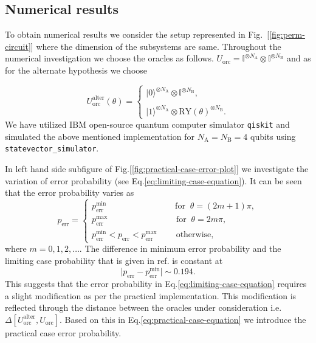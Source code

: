 \documentclass[%
 aps,
 jmp,%
 amsmath,amssymb,
 reprint,%
]{revtex4-2}
\begin{document}
\subsection{Numerical results}
To obtain numerical results we consider the setup represented in Fig.~[\ref{fig:perm-circuit}] where the dimension of the subsystems are same. Throughout the numerical investigation we choose the oracles as follows. $U_\textrm{orc} = \mathbb{I}^{\otimes N_\textrm{A}}\otimes \mathbb{I}^{\otimes N_\textrm{B}}$ and as for the alternate hypothesis we choose

\begin{equation}
U_\textrm{orc}^\textrm{alter}(\theta)= 
\begin{cases}
\lvert0\rangle^{\otimes N_\textrm{A}} \otimes \mathbb{I}^{\otimes N_\textrm{B}}, \\\\
\lvert1\rangle^{\otimes N_\textrm{A}} \otimes \textrm{RY}(\theta)^{\otimes N_\textrm{B}}.
\end{cases}
\label{eq:alternate-hypothesis}
\end{equation}
We have utilized IBM open-source
quantum computer simulator \texttt{qiskit} and simulated the above mentioned implementation for $N_\textrm{A} = N_\textrm{B} = 4$ qubits using \texttt{statevector\_simulator}. 

In left hand side subfigure of Fig.[\ref{fig:practical-case-error-plot}] we investigate the variation of error probability (see Eq.\eqref{eq:limiting-case-equation}). It can be seen that the error probability varies as
\[
p_\textrm{err} = 
\begin{cases}
p_\textrm{err}^\textrm{min}\;\;\;\;\;\;\;\;\;\;\;\;\;\;\;\;\;\;\;\;\;\;\;\;\;\;\;\;\; \textrm{for}\;\; \theta = (2m+1)\pi,\\

p_\textrm{err}^\textrm{max} \;\;\;\;\;\;\;\;\;\;\;\;\;\;\;\;\;\;\;\;\;\;\;\;\;\;\;\;\; \textrm{for}\;\; \theta = 2m\pi,\\

p_\textrm{err}^\textrm{min}<p_\textrm{err} <p_\textrm{err}^\textrm{max}\;\;\;\;\;\;\;\; \textrm{otherwise},
\end{cases}
\]
where $m=0,1,2,\ldots$. The difference in minimum error probability and the limiting case probability that is given in ref.\cite{chiribella2019quantum} is constant at
\begin{equation}
\lvert p_\textrm{err}-p_\textrm{err}^\textrm{min}\rvert\sim 0.194. 
\end{equation}
This suggests that the error probability in Eq.\eqref{eq:limiting-case-equation} requires a slight modification as per the practical implementation. This modification is reflected through the distance between the oracles under consideration i.e. $\Delta\left[U_\textrm{orc}^\textrm{alter},U_\textrm{orc}\right]$. Based on this in Eq.\eqref{eq:practical-case-equation} we introduce the practical case error probability.
\end{document}
